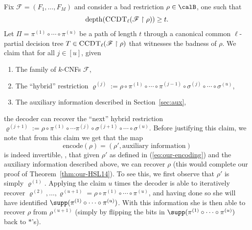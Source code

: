 \documentclass{toc}
\theoremstyle{plain}
\newcommand{\uhr}{\upharpoonright}
\newcommand{\encode}{\mathrm{encode}}
\newcommand{\CCDT}{\textsc{CCDT}}
\newcommand{\depth}{\mathrm{depth}}
\begin{document}
Fix $\mathscr{F} = (F_1,\ldots,F_M)$ and consider a bad restriction $\rho \in\calB$, one such that 
\[ \depth(\CCDT_{\ell}(\mathscr{F}\uhr\rho)) \ge t. \] 
Let $\Pi = \pi^{(1)} \circ \cdots \circ \pi^{(u)}$ be a path of length $t$ through a canonical common $\ell$-partial decision tree $T \in \CCDT_\ell(\mathscr{F} \uhr \rho)$ that witnesses the badness of $\rho$.  We claim that for all $j\in [u]$, given 
\begin{enumerate}
\item The family of $k$-CNFs $\mathscr{F}$, 
\item The ``hybrid'' restriction $\varrho^{(j)} := \rho \circ \pi^{(1)}\circ\cdots\circ \pi^{(j-1)} \circ \sigma^{(j)} \circ\cdots \circ \sigma^{(u)}$, 
\item The auxiliary information described in Section~\ref{sec:aux}, 
\end{enumerate} 
the decoder can recover the ``next'' hybrid restriction $\varrho^{(j+1)} := \rho\circ \pi^{(1)} \circ \cdots \pi^{(j)} \circ \sigma^{(j+1)}\circ \cdots \circ \sigma^{(u)}$.  Before justifying this claim, we note that from this claim we get that the map
\begin{equation}   %
  \encode(\rho) = (\rho',\text{auxiliary information})
\end{equation}
is indeed invertible, \ie, that given $\rho'$ as defined in (\ref{eq:our-encoding}) and the auxiliary information described above, we can recover $\rho$ (this would complete our proof of Theorem~\ref{thm:our-HSL14}). To see this, we first observe that $\rho'$ is simply $\varrho^{(1)}$. Applying the claim $u$ times the decoder is able to iteratively recover $\varrho^{(2)},\ldots,\varrho^{(u+1)} = \rho\circ\pi^{(1)}\circ\cdots\circ \pi^{(u)}$, and having done so she will have identified $\supp(\pi^{(1)}\circ\cdots\circ \pi^{(u)})$. With this information she is then able to recover $\rho$ from $\rho^{(u+1)}$ (simply by flipping the bits in $\supp(\pi^{(1)}\circ\cdots\circ \pi^{(u)})$ back to $\ast$'s).
\end{document}
